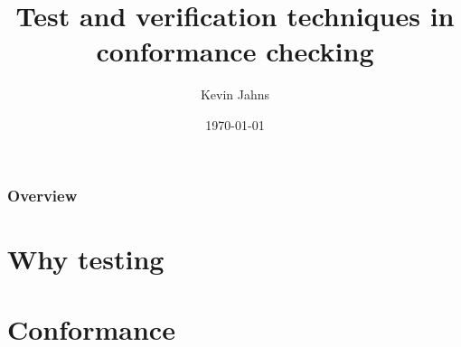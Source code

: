 \documentclass{beamer}
\title[MBT]{Test and verification techniques in conformance checking} %
\author{Kevin Jahns} %
\institute[] %
{
RWTH Aachen University \\ %
\medskip
\textit{kevin.jahns@rwth-aachen.de} %
}
\date{\today} %
\begin{document}
\begin{frame}
\titlepage %
\end{frame}

\begin{frame}
\frametitle{Overview} %
\tableofcontents %
\end{frame}


\section{Why testing}

\section{Conformance} %
\end{document}
